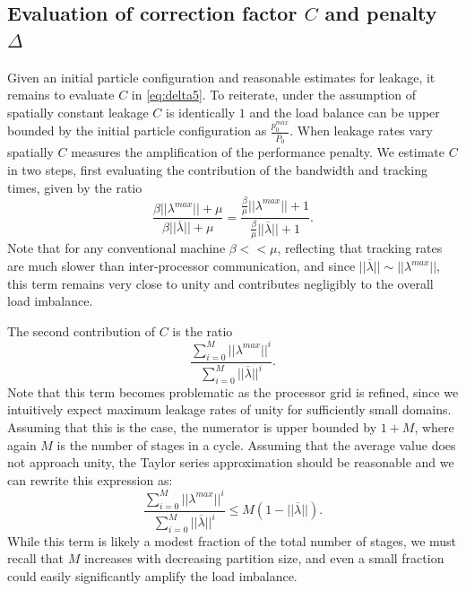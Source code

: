 \subsection{Evaluation of correction factor $C$ and penalty $\Delta$}
Given an initial particle configuration and reasonable estimates for leakage, it
remains to evaluate $C$ in \eqref{eq:delta5}. To reiterate, under the assumption
of spatially constant leakage $C$ is identically $1$ and the load balance can be
upper bounded by the initial particle configuration as
$\frac{p_0^{max}}{\overline{P_0}}$. When leakage rates vary spatially $C$
measures the amplification of the performance penalty. We estimate $C$ in two
steps, first evaluating the contribution of the bandwidth and tracking times,
given by the ratio
\begin{equation*}
  \frac{\beta ||\lambda^{max}|| + \mu}{\beta ||\overline{\lambda}|| + \mu} =
  \frac{\frac{\beta}{\mu}||\lambda^{max}|| +
    1}{\frac{\beta}{\mu}||\overline{\lambda}|| + 1}.
\end{equation*}
Note that for any conventional machine $\beta << \mu$, reflecting that tracking
rates are much slower than inter-processor communication, and since
$||\overline{\lambda}|| \sim ||\lambda^{max}||$, this term remains very close to
unity and contributes negligibly to the overall load imbalance.

The second contribution of $C$ is the ratio
\begin{equation*}
  \frac{\sum_{i=0}^M ||{\lambda^{max}}||^i}{\sum_{i=0}^M
    ||\overline{\lambda}||^i}.
\end{equation*}
Note that this term becomes problematic as the processor grid is refined, since
we intuitively expect maximum leakage rates of unity for sufficiently small
domains. Assuming that this is the case, the numerator is upper bounded by
$1+M$, where again $M$ is the number of stages in a cycle. Assuming that the
average value does not approach unity, the Taylor series approximation should be
reasonable and we can rewrite this expression as:
\begin{equation*}
  \frac{\sum_{i=0}^M ||{\lambda^{max}}||^i}{\sum_{i=0}^M
    ||\overline{\lambda}||^i} \le M(1-||\overline\lambda||).
\end{equation*}
While this term is likely a modest fraction of the total number of stages, we
must recall that $M$ increases with decreasing partition size, and even a small
fraction could easily significantly amplify the load imbalance.

